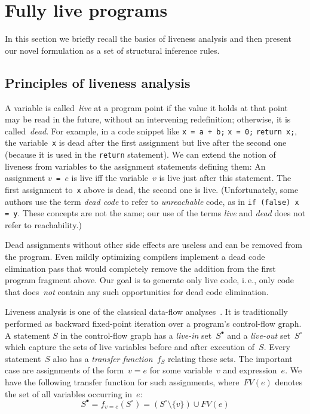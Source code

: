 \documentclass[a4paper]{easychair}
\newcommand{\liveout}[1]{\ensuremath{#1^{\circ}}}
\newcommand{\livein}[1]{\ensuremath{#1^{\bullet}}}
\def\union{\cup}
\begin{document}
\section{Fully live programs}

In this section we briefly recall the basics of liveness analysis and then
present our novel formulation as a set of structural inference rules.

\subsection{Principles of liveness analysis}

A variable is called~\emph{live} at a program point if the value it holds at
that point may be read in the future, without an intervening redefinition;
otherwise, it is called~\emph{dead}.
For example, in a code snippet like \verb|x = a + b;| \verb|x = 0;|
\verb|return x;|, the variable~\verb|x| is dead after the first assignment
but live after the second one (because it is used in the \verb|return|
statement). We can extend the notion of liveness from variables to the
assignment statements defining them: An assignment \(v\)\verb| = |\(e\) is
live iff the variable~\(v\) is live just after this statement. The
first assignment to~\verb|x| above is dead, the second one is live.
(Unfortunately, some authors
use the term \emph{dead code} to refer to \emph{unreachable} code, as in
\texttt{if (false) x = y}. These concepts are not the same; our use of the
terms \emph{live} and \emph{dead} does not refer to reachability.)

Dead assignments without other side effects are useless and can be removed
from the program. Even mildly optimizing compilers implement a dead code
elimination pass that would completely remove the addition from the first
program fragment above. Our goal is to generate only live code, i.\,e., only
code that does~\emph{not} contain any such opportunities for dead code
elimination.

Liveness analysis is one of the classical data-flow
analyses~\cite{nielson.etal-1999}. It is traditionally performed as backward
fixed-point iteration over a program's control-flow graph. A statement \(S\)
in the control-flow graph has a \emph{live-in} set~\(\livein{S}\) and a
\emph{live-out} set~\(\liveout{S}\) which capture the sets of live variables
before and after execution of~\(S\). Every statement~\(S\) also has a
\emph{transfer function}~\(f_S\) relating these sets. The important case are
assignments of the form~\(v = e\) for some variable~\(v\) and
expression~\(e\). We have the following transfer function for such
assignments, where~\(FV(e)\) denotes the set of all variables occurring
in~\(e\):
\[
\livein{S} = f_{v = e}(\liveout{S})
           = (\liveout{S} \setminus \{v\}) \union FV(e)
\]
\end{document}
